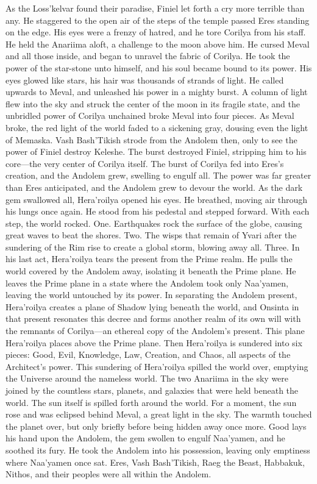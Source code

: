 \documentclass[smalldemyvopaper,11pt,twoside,onecolumn,openright,extrafontsizes]{memoir}
\begin{document}
{{As the Loss’kelvar found their paradise, Finiel let forth a cry more terrible than any. He staggered to the open air of the steps of the temple passed Eres standing on the edge. His eyes were a frenzy of hatred, and he tore Corilya from his staff. He held the Anariima aloft, a challenge to the moon above him. He cursed Meval and all those inside, and began to unravel the fabric of Corilya. He took the power of the star-stone unto himself, and his soul became bound to its power. His eyes glowed like stars, his hair was thousands of strands of light. He called upwards to Meval, and unleashed his power in a mighty burst. A column of light flew into the sky and struck the center of the moon in its fragile state, and the unbridled power of Corilya unchained broke Meval into four pieces. As Meval broke, the red light of the world faded to a sickening gray, dousing even the light of Memaska. Vash Bash’Tikish strode from the Andolem then, only to see the power of Finiel destroy Keleshe. The burst destroyed Finiel, stripping him to his core—the very center of Corilya itself. The burst of Corilya fed into Eres’s creation, and the Andolem grew, swelling to engulf all. The power was far greater than Eres anticipated, and the Andolem grew to devour the world.
As the dark gem swallowed all, Hera’roilya opened his eyes. He breathed, moving air through his lungs once again. He stood from his pedestal and stepped forward. With each step, the world rocked. One. Earthquakes rock the surface of the globe, causing great waves to beat the shores. Two. The wisps that remain of Yvari after the sundering of the Rim rise to create a global storm, blowing away all. Three. In his last act, Hera’roilya tears the present from the Prime realm. He pulls the world covered by the Andolem away, isolating it beneath the Prime plane. He leaves the Prime plane in a state where the Andolem took only Naa’yamen, leaving the world untouched by its power. In separating the Andolem present, Hera’roilya creates a plane of Shadow lying beneath the world, and Onsinta in that present resonates this decree and forms another realm of its own will with the remnants of Corilya—an ethereal copy of the Andolem’s present. This plane Hera’roilya places above the Prime plane. Then Hera’roilya is sundered into six pieces: Good, Evil, Knowledge, Law, Creation, and Chaos, all aspects of the Architect’s power.
 This sundering of Hera’roilya spilled the world over, emptying the Universe around the nameless world. The two Anariima in the sky were joined by the countless stars, planets, and galaxies that were held beneath the world. The sun itself is spilled forth around the world. For a moment, the sun rose and was eclipsed behind Meval, a great light in the sky. The warmth touched the planet over, but only briefly before being hidden away once more. Good lays his hand upon the Andolem, the gem swollen to engulf Naa’yamen, and he soothed its fury. He took the Andolem into his possession, leaving only emptiness where Naa’yamen once sat. Eres, Vash Bash’Tikish, Raeg the Beast, Habbakuk, Nithos, and their peoples were all within the Andolem.
}}
\end{document}
